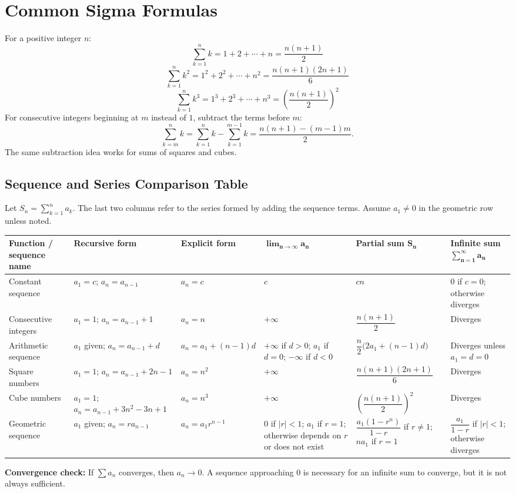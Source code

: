\documentclass[11pt]{article}
\begin{document}
\clearpage
\section*{Common Sigma Formulas}
For a positive integer $n$:
\[
  \sum_{k=1}^{n}k=1+2+\cdots+n=\frac{n(n+1)}2
\]
\[
  \sum_{k=1}^{n}k^2=1^2+2^2+\cdots+n^2
  =\frac{n(n+1)(2n+1)}6
\]
\[
  \sum_{k=1}^{n}k^3=1^3+2^3+\cdots+n^3
  =\left(\frac{n(n+1)}2\right)^2
\]
For consecutive integers beginning at $m$ instead of $1$, subtract the terms before $m$:
\[
  \sum_{k=m}^{n}k
  =\sum_{k=1}^{n}k-\sum_{k=1}^{m-1}k
  =\frac{n(n+1)-(m-1)m}{2}.
\]
The same subtraction idea works for sums of squares and cubes.

\begin{landscape}
\section*{Sequence and Series Comparison Table}
Let $S_n=\sum_{k=1}^{n}a_k$. The last two columns refer to the series formed by adding the sequence terms. Assume $a_1\ne0$ in the geometric row unless noted.

\scriptsize
\begin{tabular}{>{\raggedright\arraybackslash}p{1.35in} >{\raggedright\arraybackslash}p{1.55in} >{\raggedright\arraybackslash}p{1.2in} >{\raggedright\arraybackslash}p{1.35in} >{\raggedright\arraybackslash}p{1.8in} >{\raggedright\arraybackslash}p{1.35in}}
\toprule
\textbf{Function / sequence name} & \textbf{Recursive form} & \textbf{Explicit form} & \textbf{$\boldsymbol{\lim_{n\to\infty}a_n}$} & \textbf{Partial sum $\boldsymbol{S_n}$} & \textbf{Infinite sum $\boldsymbol{\sum_{n=1}^{\infty}a_n}$} \\
\midrule
Constant sequence
& $a_1=c$; $a_n=a_{n-1}$
& $a_n=c$
& $c$
& $cn$
& $0$ if $c=0$; otherwise diverges \\
\addlinespace
Consecutive integers
& $a_1=1$; $a_n=a_{n-1}+1$
& $a_n=n$
& $+\infty$
& $\dfrac{n(n+1)}2$
& Diverges \\
\addlinespace
Arithmetic sequence
& $a_1$ given; $a_n=a_{n-1}+d$
& $a_n=a_1+(n-1)d$
& $+\infty$ if $d>0$; $a_1$ if $d=0$; $-\infty$ if $d<0$
& $\dfrac n2\bigl(2a_1+(n-1)d\bigr)$
& Diverges unless $a_1=d=0$ \\
\addlinespace
Square numbers
& $a_1=1$; $a_n=a_{n-1}+2n-1$
& $a_n=n^2$
& $+\infty$
& $\dfrac{n(n+1)(2n+1)}6$
& Diverges \\
\addlinespace
Cube numbers
& $a_1=1$; $a_n=a_{n-1}+3n^2-3n+1$
& $a_n=n^3$
& $+\infty$
& $\left(\dfrac{n(n+1)}2\right)^2$
& Diverges \\
\addlinespace
Geometric sequence
& $a_1$ given; $a_n=ra_{n-1}$
& $a_n=a_1r^{n-1}$
& $0$ if $|r|<1$; $a_1$ if $r=1$; otherwise depends on $r$ or does not exist
& $\dfrac{a_1(1-r^n)}{1-r}$ if $r\ne1$; $na_1$ if $r=1$
& $\dfrac{a_1}{1-r}$ if $|r|<1$; otherwise diverges \\
\bottomrule
\end{tabular}
\normalsize

\vspace{0.6em}
\textbf{Convergence check:} If $\sum a_n$ converges, then $a_n\to0$. A sequence approaching $0$ is necessary for an infinite sum to converge, but it is not always sufficient.
\end{landscape}
\end{document}
